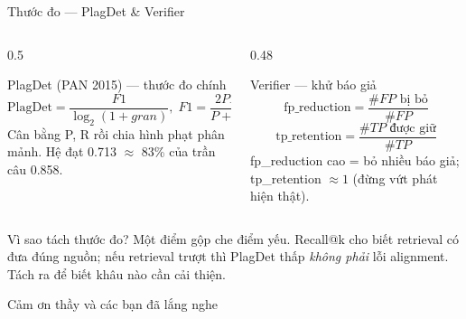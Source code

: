 \documentclass[aspectratio=169,11pt]{beamer}
\def\textbf#1{#1}%
\begin{document}
\begin{frame}{Thước đo — PlagDet \& Verifier}
\small
\begin{columns}[T]
\begin{column}{0.5\textwidth}
\begin{block}{PlagDet (PAN 2015) — thước đo chính}
\[ \mathrm{PlagDet} = \frac{F1}{\log_2(1+gran)}, \; F1 = \frac{2PR}{P+R} \]
\footnotesize Cân bằng P, R rồi chia hình phạt phân mảnh. Hệ đạt \textbf{0.713} $\approx$ \textbf{83\% của trần câu 0.858}.
\end{block}
\end{column}
\begin{column}{0.48\textwidth}
\begin{block}{Verifier — khử báo giả}
\[ \text{fp\_reduction} = \frac{\#FP\text{ bị bỏ}}{\#FP} \]
\[ \text{tp\_retention} = \frac{\#TP\text{ được giữ}}{\#TP} \]
\footnotesize fp\_reduction cao = bỏ nhiều báo giả; tp\_retention $\approx 1$ (đừng vứt phát hiện thật).
\end{block}
\end{column}
\end{columns}

\vspace{0.15cm}
\begin{block}{\footnotesize Vì sao tách thước đo?}
\footnotesize Một điểm gộp che điểm yếu. Recall@k cho biết retrieval có đưa đúng nguồn; nếu retrieval trượt thì PlagDet thấp \emph{không phải} lỗi alignment. Tách ra để biết \textbf{khâu nào cần cải thiện}.
\end{block}
\end{frame}

{
\begin{frame}[plain]
    \vfill\centering
    \textcolor{hcmusblue}{\textbf{\Huge Cảm ơn thầy và các bạn đã lắng nghe}}
    \vfill
\end{frame}
}
\end{document}
